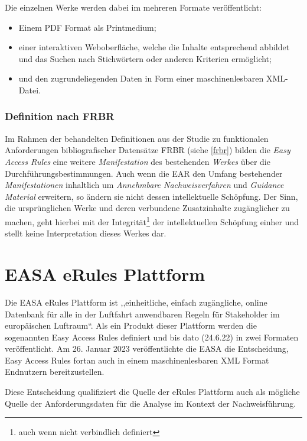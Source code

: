     \medskip
    \noindent
    Die einzelnen Werke werden dabei im mehreren Formate veröffentlicht:
    \begin{itemize}
        \item Einem PDF Format als Printmedium;
        \item einer interaktiven Weboberfläche, welche die Inhalte entsprechend abbildet und das Suchen nach Stichwörtern oder anderen Kriterien ermöglicht;
        \item  und den zugrundeliegenden Daten in Form einer maschinenlesbaren XML-Datei. \cite{easa_xml_export}
    \end{itemize}

\subsubsection{Definition nach FRBR}

    Im Rahmen der behandelten Definitionen aus der Studie zu funktionalen Anforderungen bibliografischer Datensätze \acs{FRBR} (siehe \ref{frbr}) bilden die \textit{Easy Access Rules} eine weitere \textit{Manifestation} des bestehenden \textit{Werkes} über die Durchführungsbestimmungen.
    Auch wenn die \ac{EAR} den Umfang bestehender \textit{Manifestationen} inhaltlich um \textit{Annehmbare Nachweisverfahren} und \textit{Guidance Material} erweitern, so ändern sie nicht dessen intellektuelle Schöpfung.
    Der Sinn, die ursprünglichen Werke und deren verbundene Zusatzinhalte zugänglicher zu machen, geht hierbei mit der Integrität\footnote{auch wenn nicht verbindlich definiert} der intellektuellen Schöpfung einher und stellt keine Interpretation dieses Werkes dar.

\pagebreak
\section{EASA eRules Plattform}

    Die \ac{EASA} eRules Plattform ist ,,einheitliche, einfach zugängliche, online Datenbank für alle in der Luftfahrt anwendbaren Regeln für Stakeholder im europäischen Luftraum``\cite[5]{easa_xml_doc}.
    Als ein Produkt dieser Plattform werden die sogenannten Easy Access Rules definiert und bis dato (24.6.22) in zwei Formaten veröffentlicht. 
    Am 26. Januar 2023 veröffentlichte die \ac{EASA} die Entscheidung, Easy Access Rules fortan auch in einem maschinenlesbaren \ac{XML} Format Endnutzern bereitzustellen. \cite{easa_xml_publication}

    \medskip
    Diese Entscheidung qualifiziert die Quelle der eRules Plattform auch als mögliche Quelle der Anforderungsdaten für die Analyse im Kontext der Nachweisführung. 
    

